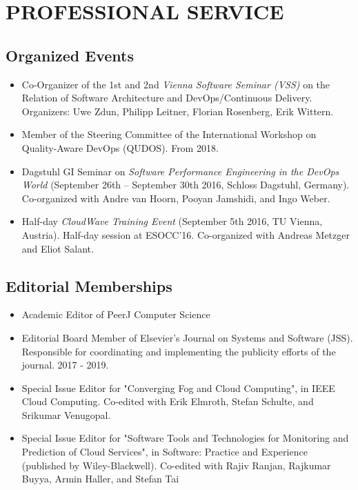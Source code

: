 \documentclass[paper=letter,fontsize=11pt]{scrartcl} %
\newcommand{\NewPart}[2]{\section*{\uppercase{#1} #2}}
\begin{document}
\NewPart{Professional Service}{}

\subsection*{Organized Events}
\begin{itemize}
\item Co-Organizer of the 1st and 2nd \emph{Vienna Software Seminar (VSS)} on the Relation of Software Architecture and DevOps/Continuous Delivery. Organizers: Uwe Zdun, Philipp Leitner, Florian Rosenberg, Erik Wittern.
\item Member of the Steering Committee of the International Workshop on Quality-Aware DevOps (QUDOS). From 2018.
\item Dagstuhl GI Seminar on \emph{Software Performance Engineering in the DevOps World} (September 26th – September 30th 2016, Schloss Dagstuhl, Germany). Co-organized with Andre van Hoorn, Pooyan Jamshidi, and Ingo Weber.
\item Half-day \emph{CloudWave Training Event} (September 5th 2016, TU Vienna, Austria). Half-day session at ESOCC'16. Co-organized with Andreas Metzger and Eliot Salant.
\end{itemize}

\subsection*{Editorial Memberships}
\begin{itemize}
\item Academic Editor of PeerJ Computer Science
\item Editorial Board Member of Elsevier's Journal on Systems and Software (JSS). Responsible for coordinating and implementing the publicity efforts of the journal. 2017 - 2019.
\item Special Issue Editor for "Converging Fog and Cloud Computing", in IEEE Cloud Computing. Co-edited with Erik Elmroth, Stefan Schulte, and Srikumar Venugopal.
\item Special Issue Editor for "Software Tools and Technologies for Monitoring and Prediction of Cloud Services", in Software: Practice and Experience (published by Wiley-Blackwell). Co-edited with Rajiv Ranjan, Raj\-kumar Buyya, Armin Haller, and Stefan Tai
\end{itemize}
\end{document}
